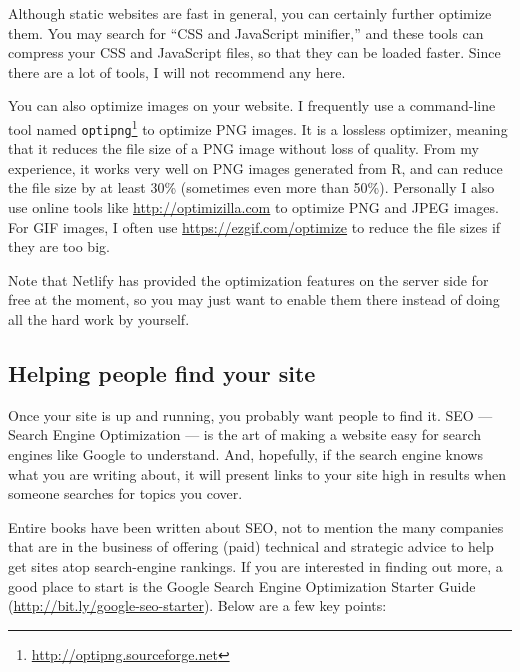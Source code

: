 \documentclass[12pt,]{krantz}
\renewcommand{\href}[2]{#2\footnote{\url{#1}}}
\theoremstyle{definition}
\theoremstyle{definition}
\theoremstyle{definition}
\theoremstyle{remark}
\begin{document}
Although static websites are fast in general, you
can certainly further optimize them. You may search for ``CSS and
JavaScript minifier,'' and these tools can compress your CSS and
JavaScript files, so that they can be loaded faster. Since there are a
lot of tools, I will not recommend any here.

You can also optimize images on your website. I frequently use a
command-line tool named
\href{http://optipng.sourceforge.net}{\texttt{optipng}} to optimize PNG
images. It is a lossless optimizer, meaning that it reduces the file
size of a PNG image without loss of quality. From my experience, it
works very well on PNG images generated from R, and can reduce the file
size by at least 30\% (sometimes even more than 50\%). Personally I also
use online tools like \url{http://optimizilla.com} to optimize PNG and
JPEG images. For GIF images, I often use
\url{https://ezgif.com/optimize} to reduce the file sizes if they are
too big.

Note that Netlify has provided the optimization features on the server
side for free at the moment, so you may just want to enable them there
instead of doing all the hard work by yourself.

\subsection{Helping people find your
site}\label{helping-people-find-your-site}

Once your site is up and running, you probably want people to find it.
SEO --- Search Engine Optimization --- is the art of making a website
easy for search engines like Google to understand. And, hopefully, if
the search engine knows what you are writing about, it will present
links to your site high in results when someone searches for topics you
cover.

Entire books have been written about SEO, not to mention the many
companies that are in the business of offering (paid) technical and
strategic advice to help get sites atop search-engine rankings. If you
are interested in finding out more, a good place to start is the Google
Search Engine Optimization Starter Guide
(\url{http://bit.ly/google-seo-starter}). Below are a few key points:
\end{document}
